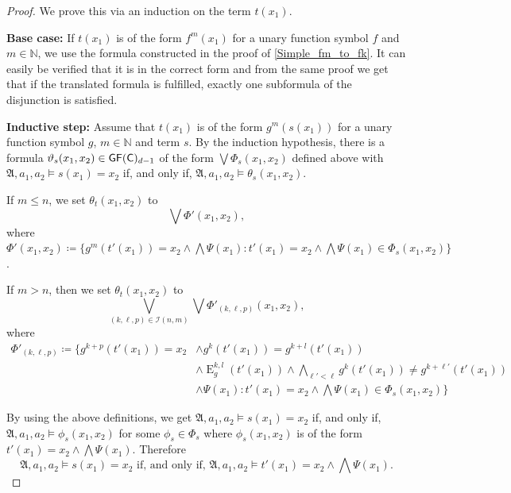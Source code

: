 \begin{proof}
	We prove this via an induction on the term $t(x_1)$.
	
	\textbf{Base case:}
	If $t(x_1)$ is of the form $f^{m}(x_1)$ for a unary function symbol $f$ and $m\in \mathbb N$, we use the formula constructed in the proof of \cref{Simple_fm_to_fk}.
	It can easily be verified that it is in the correct form and from the same proof we get that if the translated formula is fulfilled, exactly one subformula of the disjunction is satisfied.
	
	\textbf{Inductive step:}
	Assume that $t(x_1)$ is of the form $g^m(s(x_1))$ for a unary function symbol $g$, $m\in\mathbb N$ and term $s$.
	By the induction hypothesis, there is a formula $\vartheta_{s}(x_1,x_2)\in \mathsf{GF}(\mathsf{C})_{d-1}$ of the form $\bigvee \Phi_s(x_1,x_2)$ defined above with $\mathfrak A,a_1,a_2 \models s(x_1)=x_2$ if, and only if, $\mathfrak A,a_1,a_2\models \theta_{s}(x_1,x_2)$.
	
	If $m\leq n$, we set $\theta_{t}(x_1,x_2)$ to
	$$\bigvee \Phi'(x_1,x_2),$$
	where $\Phi'(x_1,x_2)\coloneqq\{g^{m}(t'(x_1))=x_2 \land \bigwedge \Psi(x_1) : t'(x_1)=x_2 \land \bigwedge \Psi(x_1)\in \Phi_s(x_1,x_2)\}$.
	
	If $m>n$, then we set $\theta_{t}(x_1,x_2)$ to
	$$\bigvee_{(k,\ell,p)\in \mathcal I(n,m)} \bigvee \Phi'_{(k,\ell,p)}(x_1,x_2),$$
	where 
	\begin{align*}
		\Phi'_{(k,\ell,p)}\coloneqq \{g^{k+p}(t'(x_1))=x_2 &\land g^{k}(t'(x_1))=g^{k+l}(t'(x_1)) \\
		& \land \operatorname{E}^{k,l}_g(t'(x_1)) \land \bigwedge_{\ell'<\ell} g^{k}(t'(x_1))\neq g^{k+\ell'}(t'(x_1)) \\
		& \land \Psi(x_1) : t'(x_1)=x_2 \land \bigwedge \Psi(x_1)\in \Phi_s(x_1,x_2)\}
	\end{align*}
	
	By using the above definitions, we get $\mathfrak A,a_1,a_2\models s(x_1)=x_2$ if, and only if, $\mathfrak A,a_1,a_2\models \phi_s(x_1,x_2)$ for some $\phi_s\in\Phi_s$ where $\phi_s(x_1,x_2)$ is of the form $t'(x_1)=x_2 \land \bigwedge \Psi(x_1)$.
	Therefore
	\begin{equation}
		\mathfrak A, a_1,a_2 \models s(x_1)=x_2 \text{ if, and only if, } \mathfrak A,a_1,a_2 \models t'(x_1)=x_2 \land \bigwedge \Psi(x_1).
		\label{Equivalence_s_and_tPsi}
	\end{equation}
	

\end{proof}

